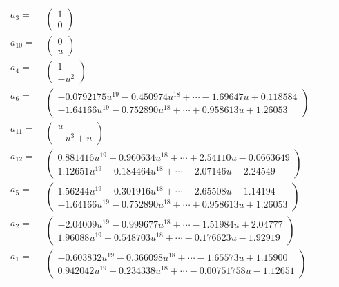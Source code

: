 \documentclass[1p]{elsarticle_modified}
\theoremstyle{definition}
\begin{document}
\begin{tabular}{m{7pt} m{180pt} m{7pt} m{180pt} }
\flushright $a_{3}=$&$\begin{pmatrix}1\\0\end{pmatrix}$ \\
\flushright $a_{10}=$&$\begin{pmatrix}0\\u\end{pmatrix}$ \\
\flushright $a_{4}=$&$\begin{pmatrix}1\\- u^2\end{pmatrix}$ \\
\flushright $a_{6}=$&$\begin{pmatrix}-0.0792175 u^{19}-0.450974 u^{18}+\cdots-1.69647 u+0.118584\\-1.64166 u^{19}-0.752890 u^{18}+\cdots+0.958613 u+1.26053\end{pmatrix}$ \\
\flushright $a_{11}=$&$\begin{pmatrix}u\\- u^3+u\end{pmatrix}$ \\
\flushright $a_{12}=$&$\begin{pmatrix}0.881416 u^{19}+0.960634 u^{18}+\cdots+2.54110 u-0.0663649\\1.12651 u^{19}+0.184464 u^{18}+\cdots-2.07146 u-2.24549\end{pmatrix}$ \\
\flushright $a_{5}=$&$\begin{pmatrix}1.56244 u^{19}+0.301916 u^{18}+\cdots-2.65508 u-1.14194\\-1.64166 u^{19}-0.752890 u^{18}+\cdots+0.958613 u+1.26053\end{pmatrix}$ \\
\flushright $a_{2}=$&$\begin{pmatrix}-2.04009 u^{19}-0.999677 u^{18}+\cdots-1.51984 u+2.04777\\1.96088 u^{19}+0.548703 u^{18}+\cdots-0.176623 u-1.92919\end{pmatrix}$ \\
\flushright $a_{1}=$&$\begin{pmatrix}-0.603832 u^{19}-0.366098 u^{18}+\cdots-1.65573 u+1.15900\\0.942042 u^{19}+0.234338 u^{18}+\cdots-0.00751758 u-1.12651\end{pmatrix}$ \\

\end{tabular}
\end{document}
